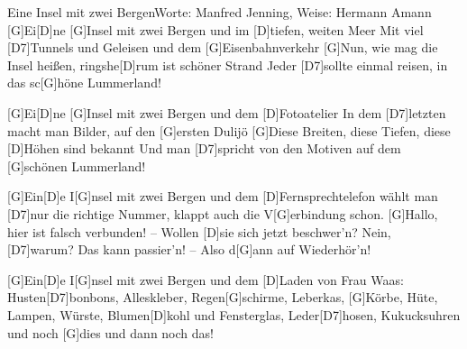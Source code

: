 \documentclass[../main.tex]{subfiles}
\begin{document}
\begin{song}{Eine Insel mit zwei Bergen}{Worte: Manfred Jenning, Weise: Hermann Amann}{}
[G]Ei[D]ne [G]Insel mit zwei Bergen und im [D]tiefen, weiten Meer
Mit viel [D7]Tunnels und Geleisen und dem [G]Eisenbahnverkehr
[G]Nun, wie mag die Insel heißen, ringshe[D]rum ist schöner Strand
Jeder [D7]sollte einmal reisen, in das sc[G]höne Lummerland!

[G]Ei[D]ne [G]Insel mit zwei Bergen und dem [D]Fotoatelier
In dem [D7]letzten macht man Bilder, auf den [G]ersten \glqq{}Dulijö\grqq{}
[G]Diese Breiten, diese Tiefen, diese [D]Höhen sind bekannt
Und man [D7]spricht von den Motiven auf dem [G]schönen Lummerland!

[G]Ein[D]e I[G]nsel mit zwei Bergen und dem [D]Fernsprechtelefon
wählt man [D7]nur die richtige Nummer, klappt auch die V[G]erbindung schon.
[G]\glqq{}Hallo, hier ist falsch verbunden!\grqq{} -- \glqq{}Wollen [D]sie sich jetzt beschwer'n?\grqq{}
\glqq{}Nein, [D7]warum? Das kann passier'n!\grqq{} -- \glqq{}Also d[G]ann auf Wiederhör'n!\grqq{}

[G]Ein[D]e I[G]nsel mit zwei Bergen und dem [D]Laden von Frau Waas:
Husten[D7]bonbons, Alleskleber, Regen[G]schirme, Leberkas,
[G]Körbe, Hüte, Lampen, Würste, Blumen[D]kohl und Fensterglas,
Leder[D7]hosen, Kukucksuhren und noch [G]dies und dann noch das!
\end{song}
\end{document}
